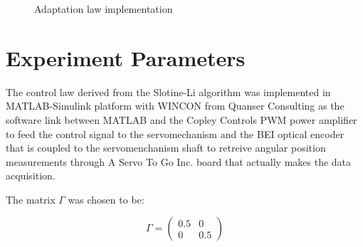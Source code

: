 \documentclass[journal]{IEEEtran}
\begin{document}
    \begin{figure}[!t]
        \centering
        \caption{Adaptation law implementation}
        \label{fig_adaptation}
    \end{figure}

\section{Experiment Parameters}
    
    The control law derived from the Slotine-Li algorithm was implemented in MATLAB-Simulink platform with WINCON from Quanser Consulting as the software link between MATLAB and the Copley Controls PWM power amplifier to feed the control signal to the servomechanism and the BEI optical encoder that is coupled to the servomenchanism shaft to retreive angular position measurements through A Servo To Go Inc. board that actually makes the data acquisition\cite{Mondie2011}.

    The matrix $\Gamma$ was chosen to be:

    \begin{equation*}
        \Gamma =
        \begin{pmatrix}
            0.5 & 0 \\
            0 & 0.5 
        \end{pmatrix}
    \end{equation*}
\end{document}
